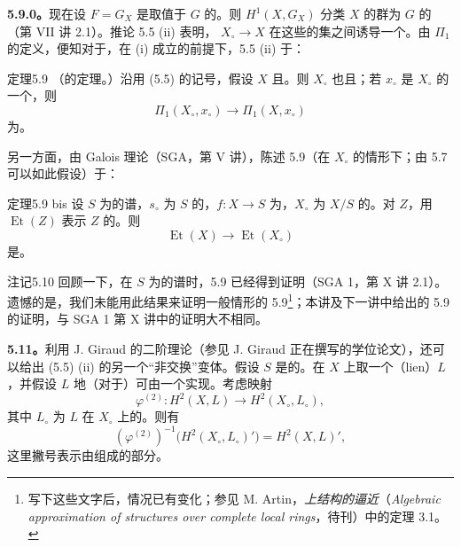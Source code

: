 \textbf{5.9.0。}现在设 $F=G_X$ 是取值于 $G$ 的。则 $H^1(X,G_X)$ 分类 $X$ 的群为 $G$ 的（第 VII 讲 2.1）。推论 5.5 (ii) 表明， $X_\circ\to X$ 在这些的集之间诱导一个。由 $\Pi_1$ 的定义，便知对于，在 (i) 成立的前提下，5.5 (ii) 于：

\begin{SGAresult}{定理}{5.9}
（的定理。）沿用 (5.5) 的记号，假设 $X$ 且。则 $X_\circ$ 也且；若 $x_\circ$ 是 $X_\circ$ 的一个，则
\[
\Pi_1(X_\circ,x_\circ)\longrightarrow\Pi_1(X,x_\circ)
\]
为。
\end{SGAresult}
另一方面，由 Galois 理论（SGA，第 V 讲），陈述 5.9（在 $X_\circ$ 的情形下；由 5.7 可以如此假设）于：
\begin{SGAresult}{定理}{5.9 bis}
设 $S$ 为的谱，$s_\circ$ 为 $S$ 的，$f:X\to S$ 为，$X_\circ$ 为 $X/S$ 的。对 $Z$，用 $\operatorname{Et}(Z)$ 表示 $Z$ 的。则
\[
\operatorname{Et}(X)\longrightarrow\operatorname{Et}(X_\circ)
\]
是。
\end{SGAresult}
\begin{SGAresult}{注记}{5.10}
回顾一下，在 $S$ 为的谱时，5.9 已经得到证明（SGA 1，第 X 讲 2.1）。遗憾的是，我们未能用此结果来证明一般情形的 5.9\footnote{写下这些文字后，情况已有变化；参见 M. Artin，\textit{上结构的逼近}（\textit{Algebraic approximation of structures over complete local rings}，待刊）中的定理 3.1。}；本讲及下一讲中给出的 5.9 的证明，与 SGA 1 第 X 讲中的证明大不相同。
\end{SGAresult}

\textbf{5.11。}利用 J. Giraud 的二阶理论（参见 J. Giraud 正在撰写的学位论文），还可以给出 (5.5) (ii) 的另一个“非交换”变体。假设 $S$ 是的。在 $X$ 上取一个（lien）$L$，并假设 $L$ 地（对于）可由一个实现。考虑映射
\[
\varphi^{(2)}:H^2(X,L)\longrightarrow H^2(X_\circ,L_\circ),
\]
其中 $L_\circ$ 为 $L$ 在 $X_\circ$ 上的。则有
\[
(\varphi^{(2)})^{-1}\bigl(H^2(X_\circ,L_\circ)'\bigr)=H^2(X,L)',\tag{5.11.1}
\]
这里撇号表示由组成的部分。

